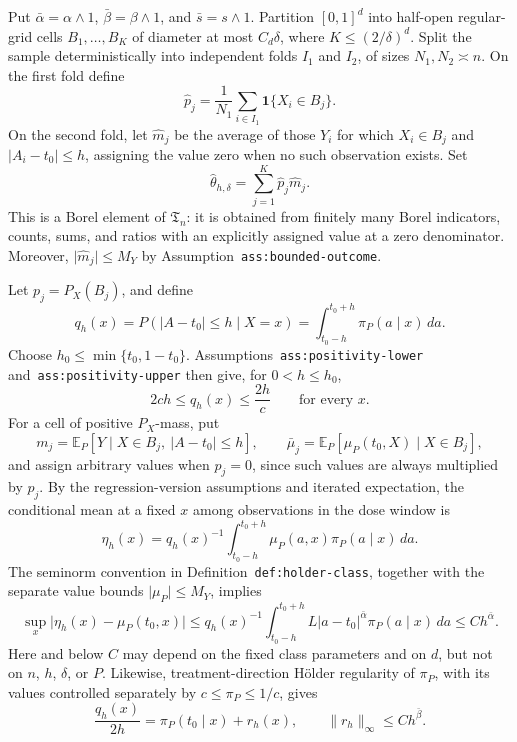 Put \(\bar\alpha=\alpha\wedge1\), \(\bar\beta=\beta\wedge1\), and \(\bar s=s\wedge1\). Partition \([0,1]^d\) into half-open regular-grid cells \(B_1,\ldots,B_K\) of diameter at most \(C_d\delta\), where \(K\le(2/\delta)^d\). Split the sample deterministically into independent folds \(I_1\) and \(I_2\), of sizes \(N_1,N_2\asymp n\). On the first fold define
\[
\widehat p_j=\frac1{N_1}\sum_{i\in I_1}\mathbf 1\{X_i\in B_j\}.
\]
On the second fold, let \(\widehat m_j\) be the average of those \(Y_i\) for which \(X_i\in B_j\) and \(\lvert A_i-t_0\rvert\le h\), assigning the value zero when no such observation exists. Set
\[
\widehat\theta_{h,\delta}=\sum_{j=1}^K\widehat p_j\widehat m_j.
\]
This is a Borel element of \(\mathfrak T_n\): it is obtained from finitely many Borel indicators, counts, sums, and ratios with an explicitly assigned value at a zero denominator. Moreover, \(\lvert\widehat m_j\rvert\le M_Y\) by Assumption~\texttt{ass:bounded-outcome}.

Let \(p_j=P_X(B_j)\), and define
\[
q_h(x)=P(\lvert A-t_0\rvert\le h\mid X=x)
      =\int_{t_0-h}^{t_0+h}\pi_P(a\mid x)\,da.
\]
Choose \(h_0\le\min\{t_0,1-t_0\}\). Assumptions~\texttt{ass:positivity-lower} and~\texttt{ass:positivity-upper} then give, for \(0<h\le h_0\),
\[
2ch\le q_h(x)\le \frac{2h}{c}
\qquad\text{for every }x.
\]
For a cell of positive \(P_X\)-mass, put
\[
m_j=\mathbb E_P[Y\mid X\in B_j,\ \lvert A-t_0\rvert\le h],
\qquad
\bar\mu_j=\mathbb E_P[\mu_P(t_0,X)\mid X\in B_j],
\]
and assign arbitrary values when \(p_j=0\), since such values are always multiplied by \(p_j\). By the regression-version assumptions and iterated expectation, the conditional mean at a fixed \(x\) among observations in the dose window is
\[
\eta_h(x)=q_h(x)^{-1}\int_{t_0-h}^{t_0+h}\mu_P(a,x)\pi_P(a\mid x)\,da.
\]
The seminorm convention in Definition~\texttt{def:holder-class}, together with the separate value bounds \(\lvert\mu_P\rvert\le M_Y\), implies
\[
\sup_x\lvert\eta_h(x)-\mu_P(t_0,x)\rvert
\le
q_h(x)^{-1}\int_{t_0-h}^{t_0+h}L\lvert a-t_0\rvert^{\bar\alpha}\pi_P(a\mid x)\,da
\le C h^{\bar\alpha}.
\]
Here and below \(C\) may depend on the fixed class parameters and on \(d\), but not on \(n\), \(h\), \(\delta\), or \(P\). Likewise, treatment-direction H\"older regularity of \(\pi_P\), with its values controlled separately by \(c\le\pi_P\le1/c\), gives
\[
\frac{q_h(x)}{2h}=\pi_P(t_0\mid x)+r_h(x),
\qquad
\lVert r_h\rVert_\infty\le C h^{\bar\beta}.
\]

